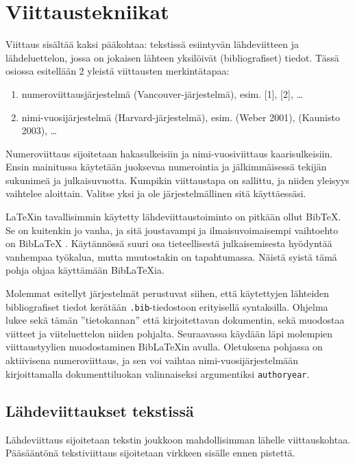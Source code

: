 \chapter{Viittaustekniikat}%
\label{ch:viittaustekniikat}

Viittaus sisältää kaksi pääkohtaa: tekstissä esiintyvän lähdeviitteen ja lähdeluettelon, jossa on jokaisen lähteen yksilöivät (bibliografiset) tiedot. Tässä osiossa esitellään 2 yleistä viittausten merkintätapaa:
\begin{enumerate}
    \item numeroviittausjärjestelmä (Vancouver-järjestelmä), esim. [1], [2], \ldots
    \item nimi-vuosijärjestelmä (Harvard-järjestelmä), esim. (Weber 2001), (Kaunisto 2003), \ldots
\end{enumerate}
Numeroviittaus sijoitetaan hakasulkeisiin ja nimi-vuosiviittaus kaarisulkeisiin. Ensin mainitussa käytetään juoksevaa numerointia ja jälkimmäisessä tekijän sukunimeä ja julkaisuvuotta. Kumpikin viittaustapa on sallittu, ja niiden yleisyys vaihtelee aloittain. Valitse yksi ja ole järjestelmällinen sitä käyttäessäsi.

\LaTeX{}in tavallisimmin käytetty lähdeviittaustoiminto on pitkään ollut Bib\TeX. Se on kuitenkin jo vanha, ja sitä joustavampi ja ilmaisuvoimaisempi vaihtoehto on Bib\LaTeX{} \parencite{biblatex}. Käytännössä suuri osa tieteellisestä julkaisemisesta hyödyntää vanhempaa työkalua, mutta muutostakin on tapahtumassa. Näistä syistä tämä pohja ohjaa käyttämään Bib\LaTeX{}ia.

Molemmat esitellyt järjestelmät perustuvat siihen, että käytettyjen lähteiden bibliografiset tiedot kerätään \texttt{.bib}-tiedostoon erityisellä syntaksilla. Ohjelma lukee sekä tämän ''tietokannan'' että kirjoitettavan dokumentin, sekä muodostaa viitteet ja viiteluettelon niiden pohjalta. Seuraavassa käydään läpi molempien viittaustyylien muodostaminen Bib\LaTeX{}in avulla. Oletuksena pohjassa on aktiivisena numeroviittaus, ja sen voi vaihtaa nimi-vuosi\-järjestelmään kirjoittamalla dokumenttiluokan valinnaiseksi argumentiksi \texttt{authoryear}.

\section{Lähdeviittaukset tekstissä}

Lähdeviittaus sijoitetaan tekstin joukkoon mahdollisimman lähelle viittauskohtaa. Pääsääntönä tekstiviittaus sijoitetaan virkkeen sisälle ennen pistettä.


